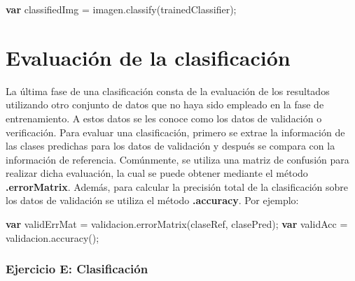 \documentclass[
  12pt,
  letterpaper,
  twoside]{book}
\newenvironment{Shaded}{\begin{snugshade}}{\end{snugshade}}
\newcommand{\ControlFlowTok}[1]{\textcolor[rgb]{0.00,0.00,0.00}{\textbf{#1}}}
\newcommand{\FunctionTok}[1]{\textcolor[rgb]{0.48,0.12,0.64}{#1}}
\newcommand{\NormalTok}[1]{#1}
\newcommand{\OperatorTok}[1]{\textcolor[rgb]{0.00,0.00,0.00}{#1}}
\newcommand{\StringTok}[1]{\textcolor[rgb]{0.87,0.29,0.22}{#1}}
\newcommand\boldpurple[1]{\textcolor{darkpurple}{\textbf{#1}}}
\begin{document}
\begin{Shaded}
\begin{Highlighting}[]
\ControlFlowTok{var}\NormalTok{ classifiedImg }\OperatorTok{=}\NormalTok{ imagen}\OperatorTok{.}\FunctionTok{classify}\NormalTok{(trainedClassifier)}\OperatorTok{;}
\end{Highlighting}
\end{Shaded}

\hypertarget{evaluaciuxf3n-de-la-clasificaciuxf3n}{%
\section{Evaluación de la clasificación}\label{evaluaciuxf3n-de-la-clasificaciuxf3n}}

La última fase de una clasificación consta de la evaluación de los resultados utilizando otro conjunto de datos que no haya sido empleado en la fase de entrenamiento. A estos datos se les conoce como los datos de validación o verificación. Para evaluar una clasificación, primero se extrae la información de las clases predichas para los datos de validación y después se compara con la información de referencia. Comúnmente, se utiliza una matriz de confusión para realizar dicha evaluación, la cual se puede obtener mediante el método \boldpurple{.errorMatrix}. Además, para calcular la precisión total de la clasificación sobre los datos de validación se utiliza el método \boldpurple{.accuracy}. Por ejemplo:

\begin{Shaded}
\begin{Highlighting}[]
\ControlFlowTok{var}\NormalTok{ validErrMat }\OperatorTok{=}\NormalTok{ validacion}\OperatorTok{.}\FunctionTok{errorMatrix}\NormalTok{(}\StringTok{\textquotesingle{}claseRef\textquotesingle{}}\OperatorTok{,} \StringTok{\textquotesingle{}clasePred\textquotesingle{}}\NormalTok{)}\OperatorTok{;}
\ControlFlowTok{var}\NormalTok{ validAcc }\OperatorTok{=}\NormalTok{ validacion}\OperatorTok{.}\FunctionTok{accuracy}\NormalTok{()}\OperatorTok{;}
\end{Highlighting}
\end{Shaded}

\hypertarget{ejercicio-e-clasificaciuxf3n}{%
\subsubsection*{Ejercicio E: Clasificación}\label{ejercicio-e-clasificaciuxf3n}}
\end{document}
